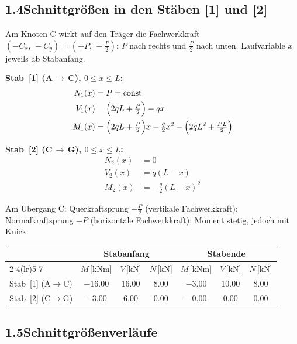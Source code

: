 \documentclass[a4paper,11pt]{article}
\begin{document}
\subsection*{1.4\quad Schnittgrößen in den Stäben [1] und [2]}

Am Knoten C wirkt auf den Träger die Fachwerkkraft
$(-C_x,\,-C_y) = (+P,\,-\tfrac{P}{2})$:
$P$ nach rechts und $\tfrac{P}{2}$ nach unten.
Laufvariable $x$ jeweils ab Stabanfang.

\textbf{Stab~[1] (A\,$\to$\,C), $0 \le x \le L$:}
\begin{align*}
  N_1(x) &= P = \text{const} \\
  V_1(x) &= \Bigl(2qL + \tfrac{P}{2}\Bigr) - qx \\
  M_1(x) &= \Bigl(2qL + \tfrac{P}{2}\Bigr)x - \tfrac{q}{2}x^2
            - \Bigl(2qL^2 + \tfrac{PL}{2}\Bigr)
\end{align*}

\textbf{Stab~[2] (C\,$\to$\,G), $0 \le x \le L$:}
\begin{align*}
  N_2(x) &= 0 \\
  V_2(x) &= q(L - x) \\
  M_2(x) &= -\tfrac{q}{2}(L - x)^2
\end{align*}

Am Übergang C: Querkraftsprung $-\tfrac{P}{2}$ (vertikale Fachwerkkraft);
Normalkraftsprung $-P$ (horizontale Fachwerkkraft); Moment stetig, jedoch mit Knick.

\medskip
\begin{center}
\begin{tabular}{l cccccc}
\toprule
 & \multicolumn{3}{c}{\textbf{Stabanfang}} & \multicolumn{3}{c}{\textbf{Stabende}} \\
\cmidrule(lr){2-4}\cmidrule(lr){5-7}
 & $M$\,[kNm] & $V$\,[kN] & $N$\,[kN]
 & $M$\,[kNm] & $V$\,[kN] & $N$\,[kN] \\
\midrule
Stab~[1] (A$\to$C) & $-16.00$ & $16.00$ & $8.00$ & $-3.00$ & $10.00$ & $8.00$ \\[3pt]
Stab~[2] (C$\to$G) & $-3.00$ & $6.00$ & $0.00$ & $-0.00$ & $0.00$ & $0.00$ \\
\bottomrule
\end{tabular}
\end{center}

\subsection*{1.5\quad Schnittgrößenverläufe}


\end{document}
